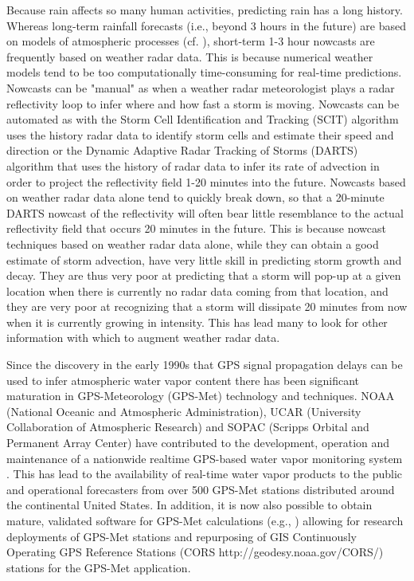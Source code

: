 \documentclass[proposal]{umassthesis}
\begin{document}
Because rain affects so many human activities, predicting rain has a long history. Whereas long-term rainfall forecasts (i.e., beyond 3 hours in the future) are based on models of atmospheric processes (cf. \cite{lynch2008origins}), short-term 1-3 hour nowcasts are frequently based on weather radar data. This is because numerical weather models tend to be too computationally time-consuming for real-time predictions. Nowcasts can be "manual" as when a weather radar meteorologist plays a radar reflectivity loop to infer where and how fast a storm is moving. Nowcasts can be automated as with the Storm Cell Identification and Tracking (SCIT) algorithm \cite{johnson1998storm} uses the history radar data to identify storm cells and estimate their speed and direction or the Dynamic Adaptive Radar Tracking of Storms (DARTS) algorithm \cite{ruzanski2011casa} that uses the history of radar data to infer its rate of advection in order to project the reflectivity field 1-20 minutes into the future. Nowcasts based on weather radar data alone tend to quickly break down, so that a 20-minute DARTS nowcast of the reflectivity will often bear little resemblance to the actual reflectivity field that occurs 20 minutes in the future. This is because nowcast techniques based on weather radar data alone, while they can obtain a good estimate of storm advection, have very little skill in predicting storm growth and decay. They are thus very poor at predicting that a storm will pop-up at a given location when there is currently no radar data coming from that location, and they are very poor at recognizing that a storm will dissipate 20 minutes from now when it is currently growing in intensity. This has lead many to look for other information with which to augment weather radar data.

Since the discovery in the early 1990s that GPS signal propagation delays can be used to infer atmospheric water vapor content \cite{bevis1992gps} \cite{bevis1994gps} there has been significant maturation in GPS-Meteorology (GPS-Met) technology and techniques. NOAA (National Oceanic and Atmospheric Administration), UCAR (University Collaboration of Atmospheric Research) and SOPAC (Scripps Orbital and Permanent Array Center) have contributed to the development, operation and maintenance of a nationwide realtime GPS-based water vapor monitoring system \cite{wolfe2000developing} \cite{bock1997scripps}. This has lead to the availability of real-time water vapor products to the public and operational forecasters from over 500 GPS-Met stations distributed around the continental United States. In addition, it is now also possible to obtain mature, validated software for GPS-Met calculations (e.g., \cite{herring2015gamit}) allowing for research deployments of GPS-Met stations \cite{nagarajan2015lowcost} and repurposing of GIS Continuously Operating GPS Reference Stations (CORS http://geodesy.noaa.gov/CORS/) stations for the GPS-Met application.
\end{document}

